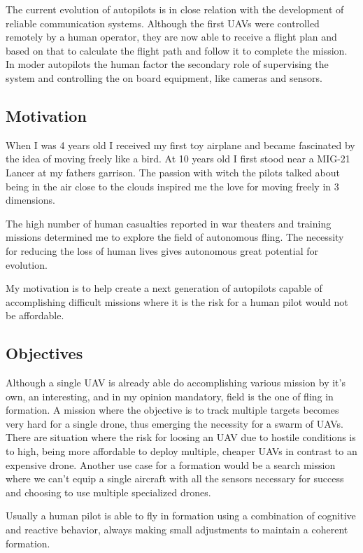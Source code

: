 The current evolution of autopilots is in close relation with the development
of reliable communication systems. Although the first UAVs were controlled
remotely by a human operator,  they are now able to receive a flight plan
and based on that to calculate the flight path and follow it to complete the 
mission. In moder autopilots the human factor the secondary role of supervising
the system and controlling the on board equipment, like cameras and sensors. 

\subsection{Motivation}
\label{sub-sec:motivation}
When I was 4 years old I received my first toy airplane and became fascinated
by the idea of moving freely like a bird. At 10 years old I first stood near a
MIG-21 Lancer at my fathers garrison. The passion with witch the pilots talked
about being in the air close to the clouds inspired me the love for moving 
freely in 3 dimensions.

The high number of human casualties reported in war theaters and training missions
determined me to explore the field of autonomous fling. The necessity for reducing
the loss of human lives gives autonomous great potential for evolution.

My motivation is to help create a next generation of autopilots capable of 
accomplishing difficult missions where it is the risk for a human pilot would 
not be affordable.

\subsection{Objectives}

Although a single UAV is already able do accomplishing various mission by it's
own, an interesting, and in my opinion mandatory,  field is the one of fling in
formation. A mission where the objective is to track multiple targets becomes
very hard for a single drone, thus emerging the necessity for a swarm of UAVs.
There are situation where the risk for loosing an UAV due to hostile conditions
is to high, being more affordable to deploy multiple,  cheaper UAVs in contrast
to an expensive drone. Another use case for a formation would be a search mission
where we can't equip a single aircraft with all the sensors necessary for success
and choosing to use multiple specialized drones.

Usually a human pilot is able to fly in formation using a combination of
cognitive and reactive behavior,  always making small adjustments to maintain a
coherent formation.

